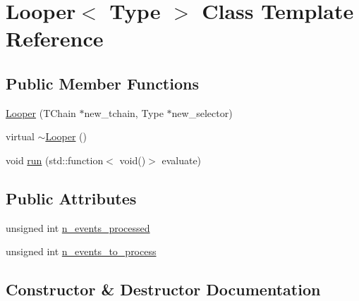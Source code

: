 \hypertarget{classLooper}{}\section{Looper$<$ Type $>$ Class Template Reference}
\label{classLooper}
\subsection*{Public Member Functions}
\begin{DoxyCompactItemize}
\item 
\hyperlink{classLooper_a1328b8985a65807d46cbc23532917fd5}{Looper} (T\+Chain $\ast$new\+\_\+tchain, Type $\ast$new\+\_\+selector)
\item 
virtual \hyperlink{classLooper_a2ab3ca481534b316d9844ada765b74b3}{$\sim$\+Looper} ()
\item 
void \hyperlink{classLooper_abfa564ca48778da1f58c8a6444ddd463}{run} (std\+::function$<$ void()$>$ evaluate)
\end{DoxyCompactItemize}
\subsection*{Public Attributes}
\begin{DoxyCompactItemize}
\item 
unsigned int \hyperlink{classLooper_a97e473848469359cd33cd23771e0eb28}{n\+\_\+events\+\_\+processed}
\item 
unsigned int \hyperlink{classLooper_a666747cb782bd6082452a6d5ac18f94f}{n\+\_\+events\+\_\+to\+\_\+process}
\end{DoxyCompactItemize}


\subsection{Constructor \& Destructor Documentation}
